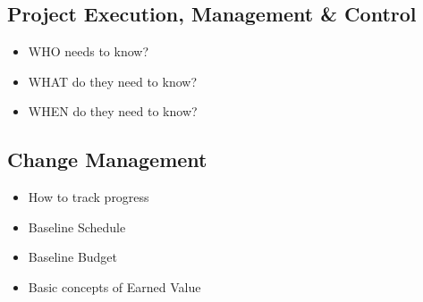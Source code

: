 \documentclass{article}[8pt]
\begin{document}
\begin{multicols}{2}
    \subsection{Project Execution, Management \& Control}
    \begin{itemize}
        \item WHO needs to know?
        \item WHAT do they need to know?
        \item WHEN do they need to know?
    \end{itemize}

    \subsection{Change Management}
    \begin{itemize}
        \item How to track progress
        \item Baseline Schedule
        \item Baseline Budget
        \item Basic concepts of Earned Value
    \end{itemize}
\end{multicols}
\end{document}
